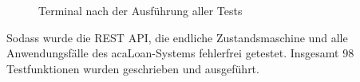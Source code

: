 \begin{figure}[h!]
	\centering
	\caption{Terminal nach der Ausführung aller Tests}
	\label{fig:test}
\end{figure}

Sodass wurde die REST API, die endliche Zustandsmaschine und alle Anwendungsfälle des acaLoan-Systems fehlerfrei getestet. Insgesamt 98 Testfunktionen wurden geschrieben und ausgeführt. 